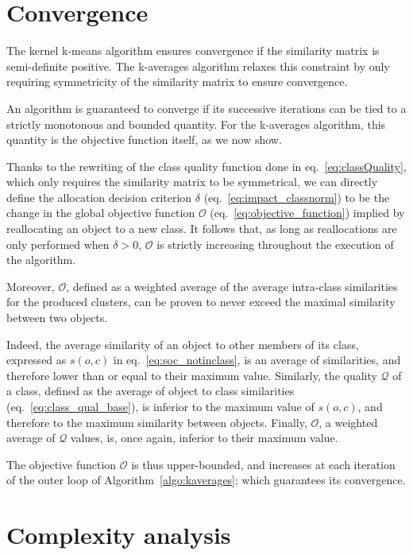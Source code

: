 \documentclass[natbib,smallextended]{svjour3}
\begin{document}
\section{Convergence}
\label{sec:convergence}

The kernel k-means algorithm ensures convergence if the similarity matrix is semi-definite positive. The k-averages algorithm relaxes this constraint by only requiring symmetricity of the similarity matrix to ensure convergence.

An algorithm is guaranteed to converge if its successive iterations can be tied to a strictly monotonous and bounded quantity. For the k-averages algorithm, this quantity is the objective function itself, as we now show.

Thanks to the rewriting of the class quality function done in eq.~\ref{eq:classQuality}, which only requires the similarity matrix to be symmetrical, we can directly define the allocation decision criterion $\delta$ (eq.~\ref{eq:impact_classnorm}) to be the change in the global objective function $\mathcal{O}$ (eq.~\ref{eq:objective_function}) implied by reallocating an object to a new class. It follows that, as long as reallocations are only performed when $\delta > 0$, $\mathcal{O}$ is strictly increasing throughout the execution of the algorithm.

Moreover, $\mathcal{O}$, defined as a weighted average of the average intra-class similarities for the produced clusters, can be proven to never exceed the maximal similarity between two objects.

Indeed, the average similarity of an object to other members of its class, expressed as $s(o,c)$ in eq.~\ref{eq:soc_notinclass}, is an average of similarities, and therefore lower than or equal to their maximum value. Similarly, the quality $\mathcal{Q}$ of a class, defined as the average of object to class similarities (eq.~\ref{eq:class_qual_base}), is inferior to the maximum value of $s(o,c)$, and therefore to the maximum similarity between objects. Finally, $\mathcal{O}$, a weighted average of $\mathcal{Q}$ values, is, once again, inferior to their maximum value.

The objective function $\mathcal{O}$ is thus upper-bounded, and increases at each iteration of the outer loop of Algorithm~\ref{algo:kaverages}; which guarantees its convergence.

\section{Complexity analysis}
\label{sec:complexity}
\end{document}
